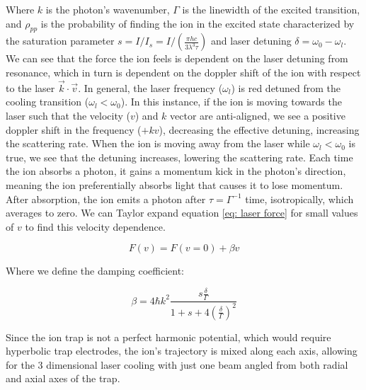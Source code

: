 Where $k$ is the photon's wavenumber, $\Gamma$ is the linewidth of the excited transition, and $\rho_{pp}$ is the probability of finding the ion in the excited  state characterized by the saturation parameter $s = I/I_s=I/(\frac{\pi h c}{3 \lambda^3 \tau})$ and laser detuning $\delta=\omega_0-\omega_l$. We can see that the force the ion feels is dependent on the laser detuning from resonance, which in turn is dependent on the doppler shift of the ion with respect to the laser $\vec{k} \cdot \vec{v}$. In general, the laser frequency ($\omega_l$) is red detuned from the cooling transition ($\omega_l < \omega_0$). In this instance, if the ion is moving towards the laser such that the velocity ($v$) and $k$ vector are anti-aligned, we see a positive doppler shift in the frequency ($+kv$), decreasing the effective detuning, increasing the scattering rate. When the ion is moving away from the laser while $\omega_l < \omega_0$ is true, we see that the detuning increases, lowering the scattering rate. Each time the ion absorbs a photon, it gains a momentum kick in the photon's direction, meaning the ion preferentially absorbs light that causes it to lose momentum. After absorption, the ion emits a photon after $\tau=\Gamma^{-1}$ time, isotropically, which averages to zero. We can Taylor expand equation \ref{eq: laser force} for small values of $v$ to find this velocity dependence.

\begin{equation*}
	F(v) = F(v=0) + \beta v
\end{equation*}

Where we define the damping coefficient:

\begin{equation*}
	\beta= 4 \hbar k^2 \frac{s \frac{\delta}{\Gamma}}{1+s+4\left(\frac{\delta}{\Gamma}\right)^2}
\end{equation*}

Since the ion trap is not a perfect harmonic potential, which would require hyperbolic trap electrodes, the ion's trajectory is mixed along each axis, allowing for the 3 dimensional laser cooling with just one beam angled from both radial and axial axes of the trap.
